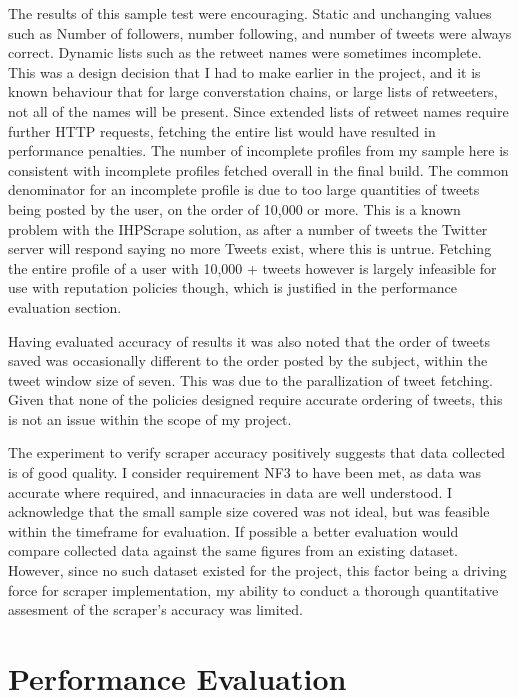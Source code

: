 The results of this sample test were encouraging. Static and unchanging values such as Number of followers, number following, and number of tweets were always correct. Dynamic lists such as the retweet names were sometimes incomplete. This was a design decision that I had to make earlier in the project, and it is known behaviour that for large converstation chains, or large lists of retweeters, not all of the names will be present. Since extended lists of retweet names require further HTTP requests, fetching the entire list would have resulted in performance penalties. The number of incomplete profiles from my sample here is consistent with incomplete profiles fetched overall in the final build. The common denominator for an incomplete profile is due to too large quantities of tweets being posted by the user, on the order of 10,000 or more. This is a known problem with the IHPScrape solution, as after a number of tweets the Twitter server will respond saying no more Tweets exist, where this is untrue.  
Fetching 
the entire profile of a user with 10,000 + tweets however is largely infeasible for use with reputation policies though, which is justified in the performance evaluation section.

Having evaluated accuracy of results it was also noted that the order of tweets saved was occasionally different to the order posted by the subject, within the tweet window size of seven. This was due to the parallization of tweet fetching. Given that none of the policies designed require accurate ordering of tweets, this is not an issue within the scope of my project. 

The experiment to verify scraper accuracy positively suggests that data collected is of good quality. I consider requirement NF3 to have been met, as data was accurate where required, and innacuracies in data are well understood. I acknowledge that the small sample size covered was not ideal, but was feasible within the timeframe for evaluation. If possible a better evaluation would compare collected data against the same figures from an existing dataset. However, since no such dataset existed for the project, this factor being a driving force for scraper implementation, my ability to conduct a thorough quantitative assesment of the scraper's accuracy was limited.

\section{Performance Evaluation}

